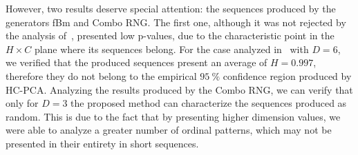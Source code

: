 However, two results deserve special attention: the sequences produced by the generators fBm and Combo RNG.
The first one, although it was not rejected by the analysis of~\cite{olivares2012contrasting}, presented low p-values, due to the characteristic point in the $H \times C$ plane where its sequences belong.
For the case analyzed in~\cite{olivares2012contrasting} with $D = 6$, we verified that the produced sequences present an average of $H = 0.997$, therefore they do not belong to the empirical $\SI{95}{\percent}$ confidence region produced by HC-PCA.
Analyzing the results produced by the Combo RNG, we can verify that only for $D = 3$ the proposed method can characterize the sequences produced as random.
This is due to the fact that by presenting higher dimension values, we were able to analyze a greater number of ordinal patterns, which may not be presented in their entirety in short sequences.

